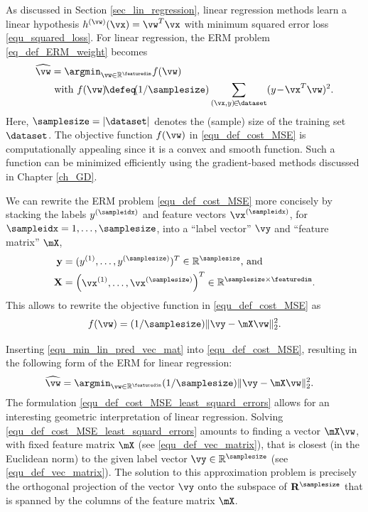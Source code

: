 \documentclass[12pt]{report}
\begin{document}
As discussed in Section \ref{sec_lin_regression}, linear regression methods learn a linear 
hypothesis $h^{(\vw)}(\vx) = \vw^{T} \vx$ with minimum squared error loss \eqref{equ_squared_loss}. 
For linear regression, the ERM problem \eqref{eq_def_ERM_weight} becomes 
\begin{align}
\label{equ_def_cost_MSE}
\widehat{\vw} & = \argmin_{\vw \in \mathbb{R}^{\featuredim}} f(\vw) \nonumber \\ 
& \mbox{ with } f(\vw)\!\defeq\!(1/\samplesize) \sum_{(\vx,y)\!\in\!\dataset} (y \!-\! \vx^{T} \vw )^2.
\end{align} 
Here, $\samplesize=|\dataset|$ denotes the (sample) size of the training set $\dataset$. 
The objective function $f(\vw)$ in \eqref{equ_def_cost_MSE} is computationally 
appealing since it is a convex and smooth function. Such a function can be minimized 
efficiently using the gradient-based methods discussed in Chapter \ref{ch_GD}. 

We can rewrite the ERM problem \eqref{equ_def_cost_MSE} more concisely 
by stacking the labels $y^{(\sampleidx)}$ and feature vectors $\vx^{(\sampleidx)}$, for 
$\sampleidx=1,\ldots,\samplesize$, into a ``label vector'' $\vy$ and ``feature matrix'' $\mX$, 
\begin{align}
\label{equ_def_vec_matrix}
\mathbf{y} & = ( y^{(1)},\ldots, y^{(\samplesize)})^{T} \in \mathbb{R}^{\samplesize} \mbox{, and } \nonumber \\ 
\mathbf{X} & = \begin{pmatrix} \vx^{(1)},\ldots,\vx^{(\samplesize)} \end{pmatrix}^{T}\in \mathbb{R}^{\samplesize \times \featuredim}.
\end{align}
This allows to rewrite the objective function in \eqref{equ_def_cost_MSE} as 
\begin{equation}
\label{equ_min_lin_pred_vec_mat}
f(\vw) = (1/\samplesize) \| \vy - \mX\vw \|^{2}_{2}.
\end{equation} 

Inserting \eqref{equ_min_lin_pred_vec_mat} into \eqref{equ_def_cost_MSE}, 
resulting in the following form of the ERM for linear regression: 
\begin{align}
\label{equ_def_cost_MSE_least_squard_errors}
\widehat{\vw} & = \argmin_{\vw \in \mathbb{R}^{\featuredim}} (1/\samplesize) \| \vy - \mX\vw \|^{2}_{2}. 
\end{align} 
The formulation \eqref{equ_def_cost_MSE_least_squard_errors} allows for an interesting geometric 
interpretation of linear regression. Solving \eqref{equ_def_cost_MSE_least_squard_errors} amounts to 
finding a vector $ \mX\vw$, with fixed feature matrix $\mX$ (see \eqref{equ_def_vec_matrix}), 
that is closest (in the Euclidean norm) to the given label vector $\vy \in \mathbb{R}^{\samplesize}$ 
(see \eqref{equ_def_vec_matrix}). The solution to this approximation problem is precisely the orthogonal projection 
of the vector $\vy$ onto the subspace of $\mathbf{R}^{\samplesize}$ that is spanned by the 
columns of the feature matrix $\mX$. 
\end{document}
